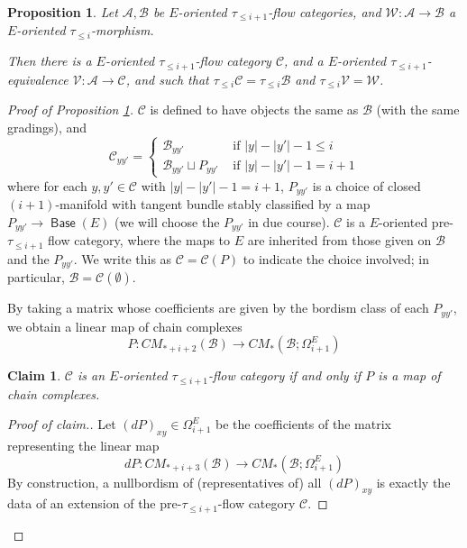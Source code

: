 \documentclass[10pt,a4paper]{amsart}
\newtheorem{prop}{Proposition}
\newtheorem{claim}{Claim}
\DeclareMathOperator{\Base}{\mathsf{Base}}
\newcommand{\cA}{\mathcal{A}}
\newcommand{\cB}{\mathcal{B}}
\newcommand{\cC}{\mathcal{C}}
\newcommand{\cV}{\mathcal{V}}
\newcommand{\cW}{\mathcal{W}}
\begin{document}
    \begin{prop}\label{prop: truncation modification}
        Let $\cA, \cB$ be $E$-oriented $\tau_{\leq i+1}$-flow categories, and $\cW: \cA \to \cB$ a $E$-oriented $\tau_{\leq i}$-morphism.

        Then there is a $E$-oriented $\tau_{\leq i+1}$-flow category $\cC$, and a $E$-oriented $\tau_{\leq i+1}$-equivalence $\cV: \cA \to \cC$, and such that $\tau_{\leq i} \cC = \tau_{\leq i} \cB$ and $\tau_{\leq i} \cV = \cW$.
    \end{prop}

    \begin{proof}[Proof of Proposition \ref{prop: truncation modification}]
        $\cC$ is defined to have objects the same as $\cB$ (with the same gradings), and
        \begin{equation}
            \cC_{yy'} = \begin{cases}
                \cB_{yy'} 
                &
                \textrm{ if } |y|-|y'|-1 \leq i
                \\
                \cB_{yy'} \sqcup P_{yy'}
                &
                \textrm{ if } |y|-|y'|-1 = i+1
            \end{cases}
        \end{equation}
        where for each $y, y' \in \cC$ with $|y|-|y'|-1 = i+1$, $P_{yy'}$ is a choice of closed $(i+1)$-manifold with tangent bundle stably classified by a map $P_{yy'} \to \Base(E)$ (we will choose the $P_{yy'}$ in due course). $\cC$ is a $E$-oriented pre-$\tau_{\leq i+1}$ flow category, where the maps to $E$ are inherited from those given on $\cB$ and the $P_{yy'}$. We write this as $\cC=\cC(P)$ to indicate the choice involved; in particular, $\cB = \cC(\emptyset)$.

        By taking a matrix whose coefficients are given by the bordism class of each $P_{yy'}$, we obtain a linear map of chain complexes
        \begin{equation}
            P: CM_{*+i+2}(\cB) \to CM_*(\cB; \Omega_{i+1}^{E})
        \end{equation}
        

        \begin{claim}
            $\cC$ is an $E$-oriented $\tau_{\leq i+1}$-flow category if and only if $P$ is a map of chain complexes.
        \end{claim}
        \begin{proof}[Proof of claim.]

            Let $(dP)_{xy} \in \Omega^{E}_{i+1}$ be the coefficients of the matrix representing the linear map
            \begin{equation}
                dP: CM_{*+i+3}(\cB) \to CM_*\left(\cB; \Omega_{i+1}^{E}\right)
            \end{equation}
            By construction, a nullbordism of (representatives of) all $(dP)_{xy}$ is exactly the data of an extension of the pre-$\tau_{\leq i+1}$-flow category $\cC$.
        \end{proof}


\end{proof}
\end{document}
